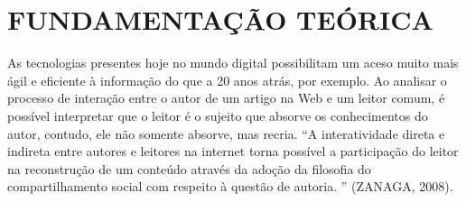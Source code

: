 %
%


\chapter{\textbf{FUNDAMENTAÇÃO TEÓRICA}}\label{chap:fundTeorica}

As tecnologias presentes hoje no mundo digital possibilitam um aceso muito mais ágil
e eficiente à informação do que a 20 anos atrás, por exemplo. Ao analisar o processo de
interação entre o autor de um artigo na Web e um leitor comum, é possível interpretar que
o leitor é o sujeito que absorve os conhecimentos do autor, contudo, ele não somente
absorve, mas recria. “A interatividade direta e indireta entre autores e leitores na internet
torna possível a participação do leitor na reconstrução de um conteúdo através da adoção
da filosofia do compartilhamento social com respeito à questão de autoria. ” (ZANAGA,
2008).